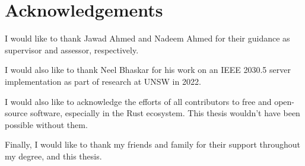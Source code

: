\chapter*{Acknowledgements}\label{Acknowledgements}
I would like to thank Jawad Ahmed and Nadeem Ahmed for their guidance as supervisor and assessor, respectively.

I would also like to thank Neel Bhaskar for his work on an IEEE 2030.5 server implementation as part of research at UNSW in 2022.

I would also like to acknowledge the efforts of all contributors to free and open-source software, especially in the Rust ecosystem. This thesis wouldn't have been possible without them.

Finally, I would like to thank my friends and family for their support throughout my degree, and this thesis.
